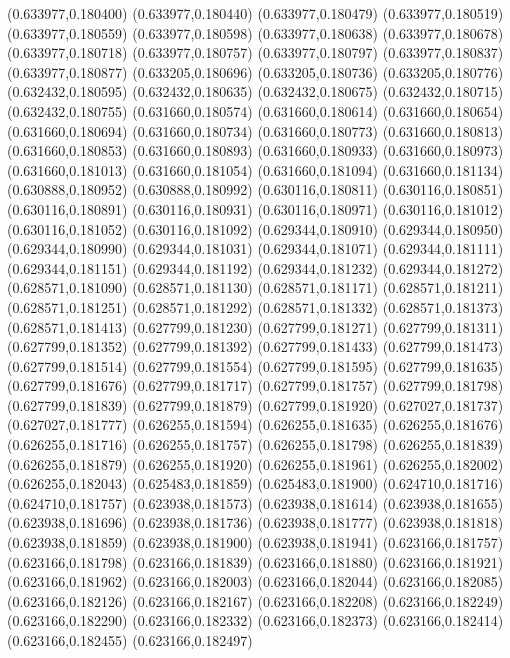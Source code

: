(0.633977,0.180400)
(0.633977,0.180440)
(0.633977,0.180479)
(0.633977,0.180519)
(0.633977,0.180559)
(0.633977,0.180598)
(0.633977,0.180638)
(0.633977,0.180678)
(0.633977,0.180718)
(0.633977,0.180757)
(0.633977,0.180797)
(0.633977,0.180837)
(0.633977,0.180877)
(0.633205,0.180696)
(0.633205,0.180736)
(0.633205,0.180776)
(0.632432,0.180595)
(0.632432,0.180635)
(0.632432,0.180675)
(0.632432,0.180715)
(0.632432,0.180755)
(0.631660,0.180574)
(0.631660,0.180614)
(0.631660,0.180654)
(0.631660,0.180694)
(0.631660,0.180734)
(0.631660,0.180773)
(0.631660,0.180813)
(0.631660,0.180853)
(0.631660,0.180893)
(0.631660,0.180933)
(0.631660,0.180973)
(0.631660,0.181013)
(0.631660,0.181054)
(0.631660,0.181094)
(0.631660,0.181134)
(0.630888,0.180952)
(0.630888,0.180992)
(0.630116,0.180811)
(0.630116,0.180851)
(0.630116,0.180891)
(0.630116,0.180931)
(0.630116,0.180971)
(0.630116,0.181012)
(0.630116,0.181052)
(0.630116,0.181092)
(0.629344,0.180910)
(0.629344,0.180950)
(0.629344,0.180990)
(0.629344,0.181031)
(0.629344,0.181071)
(0.629344,0.181111)
(0.629344,0.181151)
(0.629344,0.181192)
(0.629344,0.181232)
(0.629344,0.181272)
(0.628571,0.181090)
(0.628571,0.181130)
(0.628571,0.181171)
(0.628571,0.181211)
(0.628571,0.181251)
(0.628571,0.181292)
(0.628571,0.181332)
(0.628571,0.181373)
(0.628571,0.181413)
(0.627799,0.181230)
(0.627799,0.181271)
(0.627799,0.181311)
(0.627799,0.181352)
(0.627799,0.181392)
(0.627799,0.181433)
(0.627799,0.181473)
(0.627799,0.181514)
(0.627799,0.181554)
(0.627799,0.181595)
(0.627799,0.181635)
(0.627799,0.181676)
(0.627799,0.181717)
(0.627799,0.181757)
(0.627799,0.181798)
(0.627799,0.181839)
(0.627799,0.181879)
(0.627799,0.181920)
(0.627027,0.181737)
(0.627027,0.181777)
(0.626255,0.181594)
(0.626255,0.181635)
(0.626255,0.181676)
(0.626255,0.181716)
(0.626255,0.181757)
(0.626255,0.181798)
(0.626255,0.181839)
(0.626255,0.181879)
(0.626255,0.181920)
(0.626255,0.181961)
(0.626255,0.182002)
(0.626255,0.182043)
(0.625483,0.181859)
(0.625483,0.181900)
(0.624710,0.181716)
(0.624710,0.181757)
(0.623938,0.181573)
(0.623938,0.181614)
(0.623938,0.181655)
(0.623938,0.181696)
(0.623938,0.181736)
(0.623938,0.181777)
(0.623938,0.181818)
(0.623938,0.181859)
(0.623938,0.181900)
(0.623938,0.181941)
(0.623166,0.181757)
(0.623166,0.181798)
(0.623166,0.181839)
(0.623166,0.181880)
(0.623166,0.181921)
(0.623166,0.181962)
(0.623166,0.182003)
(0.623166,0.182044)
(0.623166,0.182085)
(0.623166,0.182126)
(0.623166,0.182167)
(0.623166,0.182208)
(0.623166,0.182249)
(0.623166,0.182290)
(0.623166,0.182332)
(0.623166,0.182373)
(0.623166,0.182414)
(0.623166,0.182455)
(0.623166,0.182497)
